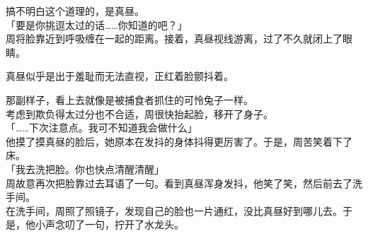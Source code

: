 搞不明白这个道理的，是真昼。\\

「要是你挑逗太过的话……你知道的吧？」\\

周将脸靠近到呼吸缠在一起的距离。接着，真昼视线游离，过了不久就闭上了眼睛。

真昼似乎是出于羞耻而无法直视，正红着脸颤抖着。

那副样子，看上去就像是被捕食者抓住的可怜兔子一样。\\

考虑到欺负得太过分也不合适，周很快抬起脸，移开了身子。\\

「……下次注意点。我可不知道我会做什么」\\

他摸了摸真昼的脸后，她原本在发抖的身体抖得更厉害了。于是，周苦笑着下了床。\\

「我去洗把脸。你也快点清醒清醒」\\

周故意再次把脸靠过去耳语了一句。看到真昼浑身发抖，他笑了笑，然后前去了洗手间。\\

在洗手间，周照了照镜子，发现自己的脸也一片通红，没比真昼好到哪儿去。于是，他小声念叨了一句，拧开了水龙头。
